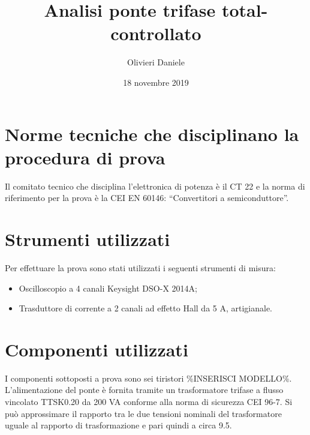 \documentclass[a4paper,10pt]{article}
\title{Analisi ponte trifase total-controllato}
\author{Olivieri Daniele}
\date{18 novembre 2019}
\begin{document}
\maketitle

\begin{abstract}

\end{abstract}

\section{Norme tecniche che disciplinano la procedura di prova}
Il comitato tecnico che disciplina l'elettronica di potenza è il CT 22 e la norma
di riferimento per la prova è la CEI EN 60146: ``Convertitori a semiconduttore''.

\section{Strumenti utilizzati}
Per effettuare la prova sono stati utilizzati i seguenti strumenti di misura:
\begin{itemize}
 \item Oscilloscopio a 4 canali Keysight DSO-X 2014A;
 \item Trasduttore di corrente a 2 canali ad effetto Hall da 5 A, artigianale.
\end{itemize}

\section{Componenti utilizzati}
I componenti sottoposti a prova sono sei tiristori \%INSERISCI MODELLO\%.
L'alimentazione del ponte è fornita tramite un trasformatore trifase a flusso vincolato 
TTSK0.20 da 200 VA conforme alla norma di sicurezza CEI 96-7.
Si può approssimare il rapporto tra le due tensioni nominali del trasformatore uguale al 
rapporto di trasformazione e pari quindi a circa 9.5.
\end{document}
